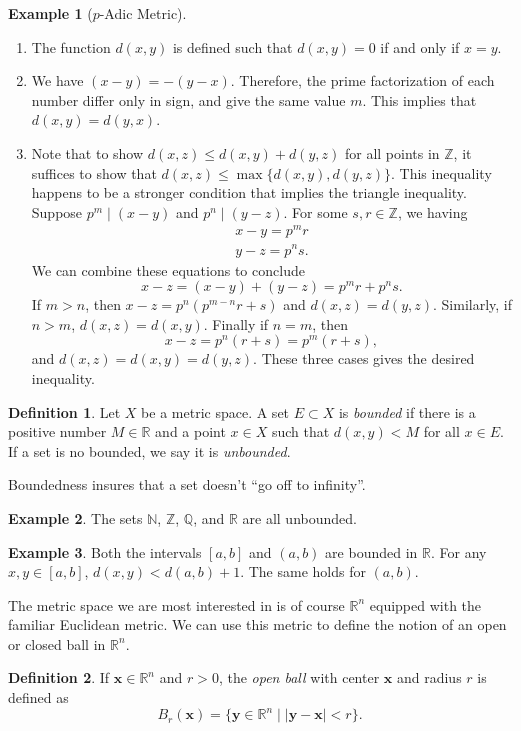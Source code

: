 \documentclass{article}
\newcommand{\N}{\mathbb{N}}
\newcommand{\R}{\mathbb{R}}
\newcommand{\Q}{\mathbb{Q}}
\newcommand{\x}{\mathbf{x}}
\newcommand{\y}{\mathbf{y}}
\newcommand{\Z}{\mathbb{Z}}
\theoremstyle{definition}
\newtheorem{definition}{Definition}[section]
\newtheorem{example}{Example}[section]
\begin{document}
\begin{example}[$ p $-Adic Metric]
\begin{enumerate}
\item The function $ d(x,y) $ is defined such that $ d(x,y)=0 $ if and only if $ x=y $. 
\item We have $ (x-y)=-(y-x) $. Therefore, the prime factorization of each number differ only in sign, and give the same value $ m $. This implies that $ d(x,y)=d(y,x) $.  
\item Note that to show $ d(x,z)\le d(x,y)+d(y,z) $ for all points in $ \Z $, it suffices to show that $ d(x,z)\le\max\{d(x,y),d(y,z)\} $. This inequality happens to be a stronger condition that implies the triangle inequality. Suppose $ p^m\mid(x-y) $ and $ p^n\mid(y-z) $. For some $ s,r\in\Z $, we having
\begin{align*}
	x-y=p^mr\\y-z=p^ns.
\end{align*}
We can combine these equations to conclude $$x-z=(x-y)+(y-z)=p^mr+p^ns. $$ If $ m>n $, then $ x-z=p^n(p^{m-n}r+s)$ and $ d(x,z)=d(y,z) $. Similarly, if $ n>m $, $ d(x,z)=d(x,y) $. Finally if $ n=m $, then $$x-z=p^n(r+s)=p^m(r+s), $$ and $ d(x,z)=d(x,y)=d(y,z) $. These three cases gives the desired inequality. 
\end{enumerate}
\end{example}
\begin{definition}
	Let $ X $ be a metric space. A set $ E\subset X $ is \textit{\color{red} bounded} if there is a positive number $ M\in\R $ and a point $ x\in X $ such that $ d(x,y)<M $ for all $ x\in E $. If a set is no bounded, we say it is \textit{\color{red}unbounded}. 
\end{definition}
Boundedness insures that a set doesn't ``go off to infinity''. 
\begin{example}
	The sets $ \N $, $ \Z $, $ \Q $, and $ \R $ are all unbounded. 
\end{example}
\begin{example}
Both the intervals $ [a,b] $ and $ (a,b) $ are bounded in $ \R $. For any $ x,y\in[a,b] $, $ d(x,y)<d(a,b)+1 $. The same holds for $ (a,b) $. 
\end{example}
The metric space we are most interested in is of course $ \R^n $ equipped with the familiar Euclidean metric. We can use this metric to define the notion of an open or closed ball in $ \R^n $. 
\begin{definition}
	If $ \x\in\R^n $ and $ r>0 $, the \textit{\color{red} open ball} with center $ \x $ and radius $ r $ is defined as $$ B_r(\x)=\{\y\in\R^n\mid|\y-\x|<r\}. $$ 
\end{definition} 
\end{document}
